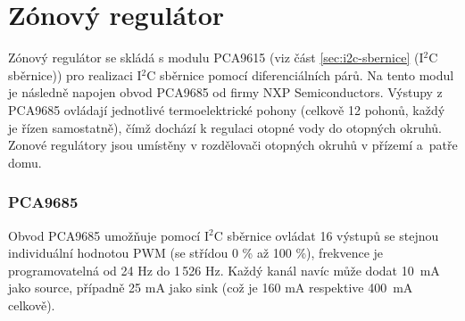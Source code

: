 \section{Zónový regulátor}
Zónový regulátor se skládá s modulu PCA9615 (viz část  \ref{sec:i2c-sbernice} (I$^2$C sběrnice)) pro realizaci I$^2$C sběrnice pomocí diferenciálních párů. Na tento modul je následně napojen obvod PCA9685 od firmy NXP Semiconductors. Výstupy z PCA9685 ovládají jednotlivé termoelektrické pohony (celkově 12 pohonů, každý je řízen samostatně), čímž dochází k regulaci otopné vody do otopných okruhů. Zonové regulátory jsou umístěny v rozdělovači otopných okruhů v přízemí a~patře domu.

\subsubsection{PCA9685}
Obvod PCA9685 umožňuje pomocí I$^2$C sběrnice ovládat 16 výstupů se stejnou individuální hodnotou PWM (se střídou 0 \% až 100 \%), frekvence je programovatelná od 24 Hz do 1\,526 Hz. Každý kanál navíc může dodat 10~mA jako source, případně 25 mA jako sink (což je 160 mA respektive 400~mA celkově).

